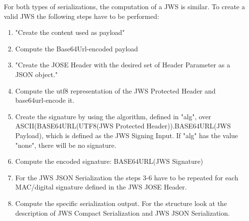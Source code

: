 For both types of serializations, the computation of a JWS is similar. To create a valid JWS the following steps have to be performed: 
\begin{enumerate}
\item "Create the content used as payload" \cite{rfc7515}
\item Compute the Base64Url-encoded payload 
\item "Create the JOSE Header with the desired set of Header Parameter as a JSON object." \cite{rfc7515}
\item Compute the utf8 representation of the JWS Protected Header and base64url-encode it.
\item Create the signature by using the algorithm, defined in "alg", over  ASCII(BASE64URL(UTF8(JWS Protected Header)).BASE64URL(JWS Payload), which is defined as the JWS Signing Input. If "alg" has the value "none", there will be no signature.
\item Compute the encoded signature: BASE64URL(JWS Signature)
\item For the JWS JSON Serialization the steps 3-6 have to be repeated for each MAC/digital signature defined in the JWS JOSE Header.
\item Compute the specific serialization output. For the structure look at the description of JWS Compact Serialization and JWS JSON Serialization.
\end{enumerate} \cite{rfc7515}




